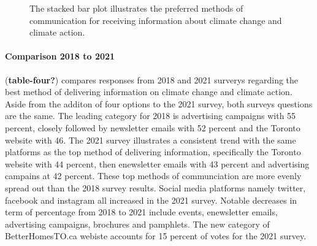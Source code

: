 \documentclass[
  letterpaper,
  DIV=11,
  numbers=noendperiod]{scrartcl}
\let\oldparagraph\paragraph
\renewcommand{\paragraph}[1]{\oldparagraph{#1}\mbox{}}
\begin{document}
\begin{figure}


\caption{\label{fig-four}The stacked bar plot illustrates the preferred
methods of communication for receiving information about climate change
and climate action.}

\end{figure}%

\paragraph{Comparison 2018 to 2021}\label{comparison-2018-to-2021-3}

(\textbf{table-four?}) compares responses from 2018 and 2021 surverys
regarding the best method of delivering information on climate change
and climate action. Aside from the additon of four options to the 2021
survey, both surveys questions are the same. The leading category for
2018 is advertising campaigns with 55 percent, closely followed by
newsletter emails with 52 percent and the Toronto website with 46. The
2021 survey illustrates a consistent trend with the same platforms as
the top method of delivering information, specifically the Toronto
website with 44 percent, then enewsletter emails with 43 percent and
advertising campains at 42 percent. These top methods of communciation
are more evenly spread out than the 2018 survey results. Social media
platforms namely twitter, facebook and instagram all increased in the
2021 survey. Notable decreases in term of percentage from 2018 to 2021
include events, enewsletter emails, advertising campaigns, brochures and
pamphlets. The new category of BetterHomesTO.ca webiste accounts for 15
percent of votes for the 2021 survey.
\end{document}
